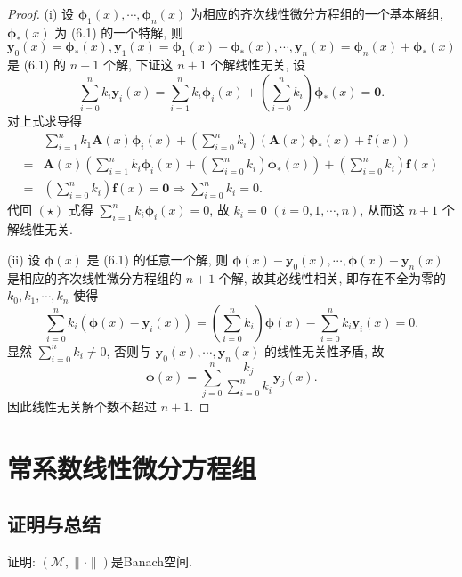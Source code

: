 \begin{proof}
  (i) 设 $\bm{\phi}_1(x),\cdots,\bm{\phi}_n(x)$ 为相应的齐次线性微分方程组的一个基本解组, 
  $\bm{\phi}_*(x)$ 为 (6.1) 的一个特解, 
  则 $\bm{y}_0(x)=\bm{\phi}_*(x),\bm{y}_1(x)=\bm{\phi}_1(x)+\bm{\phi}_*(x),\cdots,\bm{y}_n(x)=\bm{\phi}_n(x)+\bm{\phi}_*(x)$
  是 (6.1) 的 $n+1$ 个解, 下证这 $n+1$ 个解线性无关, 设
  \begin{equation}
    \sum_{i=0}^nk_i\bm{y}_i(x)=\sum_{i=1}^nk_i\bm{\phi}_i(x)+\left(\sum_{i=0}^nk_i\right)\bm{\phi}_*(x)
      = \bm{0}.\tag{$\star$}
  \end{equation}
  对上式求导得
  \begin{align*}
    & \sum_{i=1}^nk_1\bm{A}(x)\bm{\phi}_i(x)+\left(\sum_{i=0}^nk_i\right)\left(\bm{A}(x)\bm{\phi}_*(x)+\bm{f}(x)\right)\\
    ={} & \bm{A}(x)\left(\sum_{i=1}^nk_i\bm{\phi}_i(x)+\left(\sum_{i=0}^nk_i\right)\bm{\phi}_*(x)\right)+\left(\sum_{i=0}^nk_i\right)\bm{f}(x)\\
    ={} & \left(\sum_{i=0}^nk_i\right)\bm{f}(x)=\bm{0}\Rightarrow\sum_{i=0}^nk_i=0.
  \end{align*}
  代回 $(\star)$ 式得 $\sum_{i=1}^nk_i\bm{\phi}_i(x)=0$, 
  故 $k_i=0$ $(i=0,1,\cdots,n)$, 从而这 $n+1$ 个解线性无关.

  (ii) 设 $\bm{\phi}(x)$ 是 (6.1) 的任意一个解, 
  则 $\bm{\phi}(x)-\bm{y}_0(x),\cdots,\bm{\phi}(x)-\bm{y}_n(x)$
  是相应的齐次线性微分方程组的 $n+1$ 个解, 故其必线性相关, 即存在不全为零的 $k_0,k_1,\cdots,k_n$ 使得
  \[\sum_{i=0}^nk_i(\bm{\phi}(x)-\bm{y}_i(x))
    = \left(\sum_{i=0}^nk_i\right)\bm{\phi}(x)-\sum_{i=0}^nk_i\bm{y}_i(x)=0.\]
  显然 $\sum_{i=0}^nk_i\neq 0$, 否则与 $\bm{y}_0(x),\cdots,\bm{y}_n(x)$ 的线性无关性矛盾, 故
  \[\bm{\phi}(x)=\sum_{j=0}^n\frac{k_j}{\sum_{i=0}^nk_i}\bm{y}_j(x).\]
  因此线性无关解个数不超过 $n+1$.
\end{proof}



\section{常系数线性微分方程组}



\subsection{证明与总结}



证明: $(\mathcal{M},\|\cdot\|)$是Banach空间.

